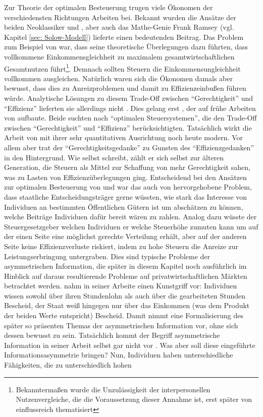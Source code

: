 Zur Theorie der optimalen Besteuerung trugen viele Ökonomen der verschiedensten Richtungen Arbeiten bei. Bekannt wurden die Ansätze der beiden Neoklassiker \textcite{Edgeworth1897} und \textcite{Pigou1920}, aber auch das Mathe-Genie Frank Ramsey (vgl. Kapitel \ref{sec: Solow-Modell}) lieferte einen bedeutenden Beitrag. Das Problem zum Beispiel von \textcite{Pigou1920} war, dass seine theoretische Überlegungen dazu führten, dass vollkommene Einkommensgleichheit zu maximalem gesamtwirtschaftlichen Gesamtnutzen führt\footnote{Bekanntermaßen wurde die Unzulässigkeit der interpersonellen Nutzenvergleiche, die die Voraussetzung dieser Annahme ist, erst später von \textcite{Robbins1932} einflussreich thematisiert}. Demnach sollten Steuern die Einkommensungleichheit vollkommen ausgleichen. Natürlich waren sich die Ökonomen damals aber bewusst, dass dies zu Anreizproblemen und damit zu Effizienzeinbußen führen würde. Analytische Lösungen zu diesem Trade-Off zwischen "`Gerechtigkeit"' und "`Effizienz"' lieferten sie allerdings nicht \parencite[S. 168]{Sandmo1999}. Dies gelang erst \textcite{Mirrlees1971}, der auf frühe Arbeiten von \textcite{Vickrey1945, Vickrey1947} aufbaute. Beide suchten nach "`optimalen Steuersystemen"', die den Trade-Off zwischen "`Gerechtigkeit"' und "`Effizienz"' berücksichtigten. Tatsächlich wirkt die Arbeit von \textcite{Mirrlees1971} mit ihrer sehr quantitativen Ausrichtung noch heute modern. Vor allem aber trat der "`Gerechtigkeitsgedanke"' zu Gunsten des "`Effizienzgedanken"' in den Hintergrund. Wie \textcite[S. 35]{Musgrave1981} selbst schreibt, zählt er sich selbst zur älteren Generation, die Steuern als Mittel zur Schaffung von mehr Gerechtigkeit sahen, was zu Lasten von Effizienzüberlegungen ging. Entscheidend bei den Ansätzen zur optimalen Besteuerung von \textcite{Vickrey1947} und \textcite{Mirrlees1971} war das auch von \textcite{Samuelson1954} hervorgehobene Problem, dass staatliche Entscheidungsträger gerne wüssten, wie stark das Interesse von Individuen an bestimmten Öffentlichen Gütern ist um abschätzen zu können, welche Beiträge Individuen dafür bereit wären zu zahlen. Analog dazu wüsste der Steuergesetzgeber welchen Individuen er welche Steuerhöhe zumuten kann um auf der einen Seite eine möglichst gerechte Verteilung erhält, aber auf der anderen Seite keine Effizienzverluste riskiert, indem zu hohe Steuern die Anreize zur Leistungserbringung untergraben. Dies sind typische Probleme der asymmetrischen Information, die später in diesem Kapitel noch ausführlich im Hinblick auf daraus resultierende Probleme auf privatwirtschaftlichen Märkten betrachtet werden. \textcite{Mirrlees1971} nahm in seiner Arbeite einen Kunstgriff vor: Individuen wissen sowohl über ihren Stundenlohn als auch über die gearbeiteten Stunden Bescheid, der Staat weiß hingegen nur über das Einkommen (was dem Produkt der beiden Werte entspricht) Bescheid. Damit nimmt \textcite{Mirrlees1971} eine Formalisierung des später so präsenten Themas der asymmetrischen Information vor, ohne sich dessen bewusst zu sein. Tatsächlich kommt der Begriff asymmetrische Information in seiner Arbeit selbst gar nicht vor \parencite[S. 170]{Sandmo1999}. Was aber soll diese eingeführte Informationsasymmetrie bringen? Nun, Individuen haben unterschiedliche Fähigkeiten, die zu unterschiedlich hohen 